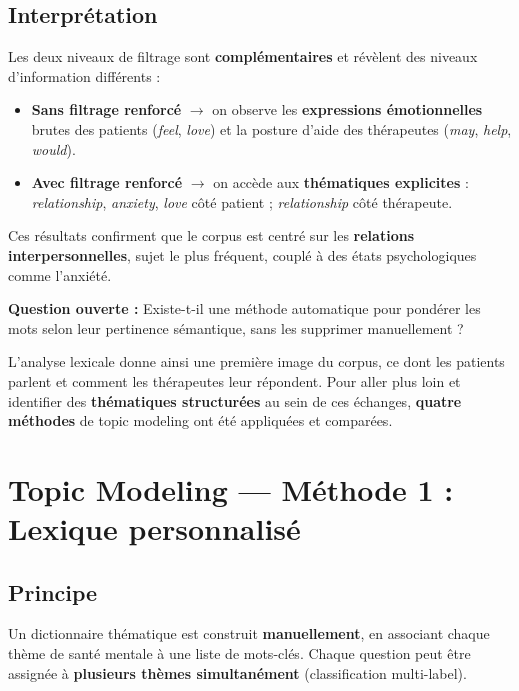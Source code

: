 \documentclass[12pt,a4paper]{article}
\begin{document}
\subsection{Interprétation}

Les deux niveaux de filtrage sont \textbf{complémentaires} et révèlent des niveaux d'information différents :

\begin{itemize}
  \item \textbf{Sans filtrage renforcé} $\rightarrow$ on observe les \textbf{expressions émotionnelles} brutes des patients (\textit{feel}, \textit{love}) et la posture d'aide des thérapeutes (\textit{may}, \textit{help}, \textit{would}).
  \item \textbf{Avec filtrage renforcé} $\rightarrow$ on accède aux \textbf{thématiques explicites} : \textit{relationship}, \textit{anxiety}, \textit{love} côté patient ; \textit{relationship} côté thérapeute.
\end{itemize}

\begin{remarque}
Ces résultats confirment que le corpus est centré sur les \textbf{relations interpersonnelles}, sujet le plus fréquent, couplé à des états psychologiques comme l'anxiété.
\end{remarque}

\textbf{Question ouverte :} Existe-t-il une méthode automatique pour pondérer les mots selon leur pertinence sémantique, sans les supprimer manuellement ?

L'analyse lexicale donne ainsi une première image du corpus, ce dont les patients parlent et comment les thérapeutes leur répondent. Pour aller plus loin et identifier des \textbf{thématiques structurées} au sein de ces échanges, \textbf{quatre méthodes} de topic modeling ont été appliquées et comparées.


\pagebreak
\section{Topic Modeling --- Méthode 1 : Lexique personnalisé}

\subsection{Principe}

Un dictionnaire thématique est construit \textbf{manuellement}, en associant chaque thème de santé mentale à une liste de mots-clés. Chaque question peut être assignée à \textbf{plusieurs thèmes simultanément} (classification multi-label).
\end{document}
